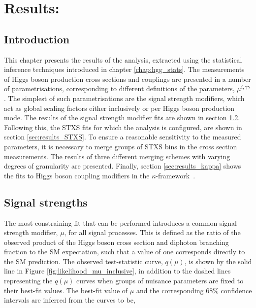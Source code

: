 \chapter{Results: \Hgg}
\label{chap:hgg_results}

\section{Introduction}
This chapter presents the results of the \Hgg analysis, extracted using the statistical inference techniques introduced in chapter \ref{chap:hgg_stats}. The measurements of Higgs boson production cross sections and couplings are presented in a number of parametrisations, corresponding to different definitions of the parameters, $\mu^{i,\gamma\gamma}$. The simplest of such parametrisations are the signal strength modifiers, which act as global scaling factors either inclusively or per Higgs boson production mode. The results of the signal strength modifier fits are shown in section \ref{sec:results_mu}. Following this, the STXS fits for which the analysis is configured, are shown in section \ref{sec:results_STXS}. To ensure a reasonable sensitivity to the measured parameters, it is necessary to merge groups of STXS bins in the cross section measurements. The results of three different merging schemes with varying degrees of granularity are presented. Finally, section \ref{sec:results_kappa} shows the fits to Higgs boson coupling modifiers in the $\kappa$-framework~\cite{Heinemeyer:2013tqa}.

\section{Signal strengths}\label{sec:results_mu}
The most-constraining fit that can be performed introduces a common signal strength modifier, $\mu$, for all signal processes. This is defined as the ratio of the observed product of the Higgs boson cross section and diphoton branching fraction to the SM expectation, such that a value of one corresponds directly to the SM prediction. The observed test-statistic curve, $q(\mu)$, is shown by the solid line in Figure \ref{fig:likelihood_mu_inclusive}, in addition to the dashed lines representing the $q(\mu)$ curves when groups of nuisance parameters are fixed to their best-fit values. The best-fit value of $\mu$ and the corresponding 68\% confidence intervals are inferred from the curves to be,

